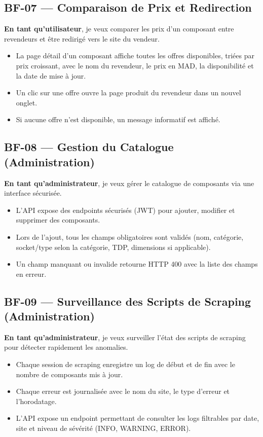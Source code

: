 \documentclass[12pt,a4paper]{article}
\begin{document}
\subsection{BF-07 — Comparaison de Prix et Redirection}

\textbf{En tant qu'utilisateur}, je veux comparer les prix d'un composant entre revendeurs et être redirigé vers le site du vendeur.

\begin{itemize}[label=\textbullet]
  \item La page détail d'un composant affiche toutes les offres disponibles, triées par prix croissant, avec le nom du revendeur, le prix en MAD, la disponibilité et la date de mise à jour.
  \item Un clic sur une offre ouvre la page produit du revendeur dans un nouvel onglet.
  \item Si aucune offre n'est disponible, un message informatif est affiché.
\end{itemize}

\subsection{BF-08 — Gestion du Catalogue (Administration)}

\textbf{En tant qu'administrateur}, je veux gérer le catalogue de composants via une interface sécurisée.

\begin{itemize}[label=\textbullet]
  \item L'API expose des endpoints sécurisés (JWT) pour ajouter, modifier et supprimer des composants.
  \item Lors de l'ajout, tous les champs obligatoires sont validés (nom, catégorie, socket/type selon la catégorie, TDP, dimensions si applicable).
  \item Un champ manquant ou invalide retourne HTTP 400 avec la liste des champs en erreur.
\end{itemize}

\subsection{BF-09 — Surveillance des Scripts de Scraping (Administration)}

\textbf{En tant qu'administrateur}, je veux surveiller l'état des scripts de scraping pour détecter rapidement les anomalies.

\begin{itemize}[label=\textbullet]
  \item Chaque session de scraping enregistre un log de début et de fin avec le nombre de composants mis à jour.
  \item Chaque erreur est journalisée avec le nom du site, le type d'erreur et l'horodatage.
  \item L'API expose un endpoint permettant de consulter les logs filtrables par date, site et niveau de sévérité (INFO, WARNING, ERROR).
\end{itemize}
\end{document}
